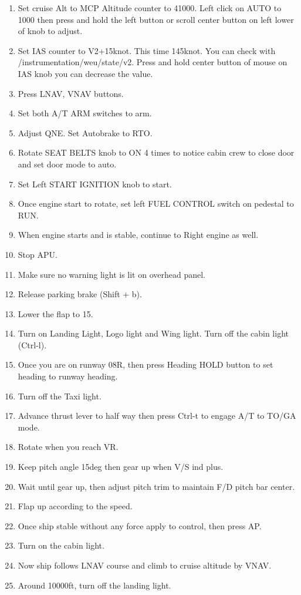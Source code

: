 \begin{enumerate}
\item Set cruise Alt to MCP Altitude counter to 41000. Left click on AUTO to 1000 then press and hold the left button or scroll center button on left lower of knob to adjust.
\item Set IAS counter to V2+15knot. This time 145knot. You can check with /instrumentation/weu/state/v2. Press and hold center button of mouse on IAS knob you can decrease the value.
\item Press LNAV, VNAV buttons.
\item Set both A/T ARM switches to arm.
\item Adjust QNE. Set Autobrake to RTO.
\item Rotate SEAT BELTS knob to ON 4 times to notice cabin crew to close door and set door mode to auto.
\item Set Left START IGNITION knob to start.
\item Once engine start to rotate, set left FUEL CONTROL switch on pedestal to RUN.
\item When engine starts and is stable, continue to Right engine as well.
\item Stop APU.
\item Make sure no warning light is lit on overhead panel.
\item Release parking brake (Shift + b).
\item Lower the flap to 15.
\item Turn on Landing Light, Logo light and Wing light. Turn off the cabin light (Ctrl-l).
\item Once you are on runway 08R, then press Heading HOLD button to set heading to runway heading.
\item Turn off the Taxi light.
\item Advance thrust lever to half way then press Ctrl-t to engage A/T to TO/GA mode.
\item Rotate when you reach VR.
\item Keep pitch angle 15deg then gear up when V/S ind plus.
\item Wait until gear up, then adjust pitch trim to maintain F/D pitch bar center.
\item Flap up according to the speed.
\item Once ship stable without any force apply to control, then press AP.
\item Turn on the cabin light.
\item Now ship follows LNAV course and climb to cruise altitude by VNAV.
\item Around 10000ft, turn off the landing light.

\end{enumerate}

